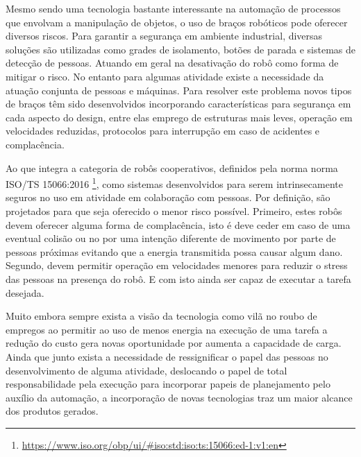 Mesmo sendo uma tecnologia bastante interessante na automação de processos que envolvam a manipulação de objetos, o uso de braços robóticos pode oferecer diversos riscos. Para garantir a segurança em ambiente industrial, diversas soluções são utilizadas como grades de isolamento, botões de parada e sistemas de detecção de pessoas. Atuando em geral na desativação do robô como forma de mitigar o risco.  No entanto para algumas atividade existe a necessidade da atuação conjunta de pessoas e máquinas. Para resolver este problema novos tipos de braços têm sido desenvolvidos incorporando características para segurança em cada aspecto do design, entre elas emprego de estruturas mais leves, operação em velocidades reduzidas, protocolos para interrupção em caso de acidentes e complacência.%

Ao que integra a categoria de robôs cooperativos, definidos pela norma  norma ISO/TS 15066:2016 \footnote{\url{https://www.iso.org/obp/ui/#iso:std:iso:ts:15066:ed-1:v1:en}}, como sistemas desenvolvidos para serem intrinsecamente seguros no uso em atividade em colaboração com pessoas. Por definição, são projetados para que seja oferecido o menor risco possível. Primeiro, estes robôs devem oferecer alguma forma de complacência, isto é deve ceder em caso de uma eventual colisão ou no por uma intenção diferente de movimento por parte de pessoas próximas evitando que a energia transmitida possa causar algum dano. Segundo, devem permitir operação em velocidades menores para reduzir o stress das pessoas na presença do robô. E com isto ainda ser capaz de executar a tarefa desejada. %

Muito embora sempre exista a visão da tecnologia como vilã no roubo de empregos ao permitir ao uso de menos energia na execução de uma tarefa a redução do custo gera novas oportunidade por aumenta a capacidade de carga. Ainda que junto exista a necessidade de ressignificar o papel das pessoas no desenvolvimento de alguma atividade, deslocando o papel de total responsabilidade pela execução para incorporar papeis de planejamento pelo auxílio da automação, a incorporação de novas tecnologias traz um maior alcance dos produtos gerados.




